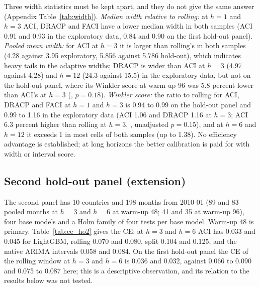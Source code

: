 Three width statistics must be kept apart, and they do not give the same answer (Appendix Table~\ref{tab:width}). \emph{Median width relative to rolling:} at $h=1$ and $h=3$ ACI, DRACP and FACI have a lower median width in both samples (ACI 0.91 and 0.93 in the exploratory data, 0.84 and 0.90 on the first hold-out panel). \emph{Pooled mean width:} for ACI at $h=3$ it is larger than rolling's in both samples (4.28 against 3.95 exploratory, 5.856 against 5.786 hold-out), which indicates heavy tails in the adaptive widths; DRACP is wider than ACI at $h=3$ (4.97 against 4.28) and $h=12$ (24.3 against 15.5) in the exploratory data, but not on the hold-out panel, where its Winkler score at warm-up 96 was 5.8 percent lower than ACI's at $h=3$ (, $p=0.18$). \emph{Winkler score:} the ratio to rolling for ACI, DRACP and FACI at $h=1$ and $h=3$ is 0.94 to 0.99 on the hold-out panel and 0.99 to 1.16 in the exploratory data (ACI 1.06 and DRACP 1.16 at $h=3$; ACI 6.3 percent higher than rolling at $h=3$, , unadjusted $p=0.15$), and at $h=6$ and $h=12$ it exceeds 1 in most cells of both samples (up to 1.38). No efficiency advantage is established; at long horizons the better calibration is paid for with width or interval score.

\subsection{Second hold-out panel (extension)}\label{sec:panel2}

The second panel has 10 countries and 198 months from 2010-01 (89 and 83 pooled months at $h=3$ and $h=6$ at warm-up 48; 41 and 35 at warm-up 96), four base models and a Holm family of four tests per base model. Warm-up 48 is primary. Table~\ref{tab:ce_ho2} gives the CE: at $h=3$ and $h=6$ ACI has 0.033 and 0.045 for LightGBM, rolling 0.070 and 0.080, split 0.104 and 0.125, and the native ARIMA intervals 0.058 and 0.084. On the first hold-out panel the CE of the rolling window at $h=3$ and $h=6$ is 0.036 and 0.032, against 0.066 to 0.090 and 0.075 to 0.087 here; this is a descriptive observation, and its relation to the results below was not tested.

\begin{table}[t]
\centering
\caption{Calibration error by interval method, horizon and base model, second hold-out panel (10 countries, warm-up 48).}
\label{tab:ce_ho2}
\small
\fittable{}
\end{table}

